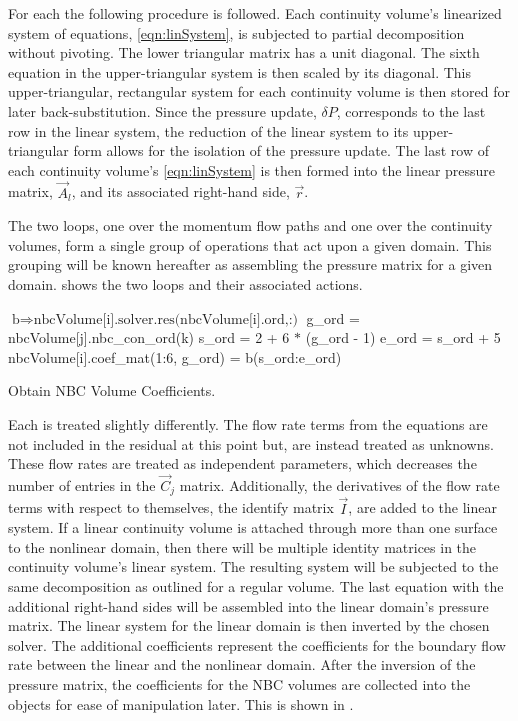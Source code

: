For each  the following procedure is followed.
Each continuity volume's linearized system of equations, \eqref{eqn:linSystem}, is subjected to partial  decomposition without pivoting.
The lower triangular matrix has a unit diagonal.
The sixth equation in the upper-triangular system is then scaled by its diagonal.
This upper-triangular, rectangular system for each continuity volume is then stored for later back-substitution.
Since the pressure update, $\delta P$, corresponds to the last row in the linear system, the reduction of the linear system to its upper-triangular form allows for the isolation of the pressure update.
The last row of each continuity volume's \eqref{eqn:linSystem} is then formed into the linear pressure matrix, $\vec{A}_{l}$, and its associated right-hand side, $\vec{r}$.

The two loops, one over the momentum flow paths and one over the continuity volumes, form a single group of operations that act upon a given domain.
This grouping will be known hereafter as assembling the pressure matrix for a given domain.
 shows the two loops and their associated actions.

\begin{algo}[ht!]
\setlength{\baselineskip}{0.625\baselineskip}
\begin{algorithmic}[1]
	\Set $\text{b} \Rightarrow \text{nbcVolume[i].solver.res(nbcVolume[i].ord,:)}$
			\Set g\_ord = nbcVolume[j].nbc\_con\_ord(k)
			\Set s\_ord = 2 + 6 $*$ (g\_ord - 1)
			\Set e\_ord = s\_ord + 5
			\Set nbcVolume[i].coef\_mat(1:6, g\_ord) = b(s\_ord:e\_ord)
		\EndFor
	\EndFor
\EndFor
\end{algorithmic}
\caption{Obtain NBC Volume Coefficients.}
\label{alg:domDecompGetCoef}
\end{algo}

Each  is treated slightly differently.
The flow rate terms from the equations are not included in the residual at this point but, are instead treated as unknowns.
These flow rates are treated as independent parameters, which decreases the number of entries in the $\vec{C}_{j}$ matrix.
Additionally, the derivatives of the flow rate terms with respect to themselves, the identify matrix $\vec{I}$, are added to the linear system.
If a linear continuity volume is attached through more than one surface to the nonlinear domain, then there will be multiple identity matrices in the continuity volume's linear system.
The resulting system will be subjected to the same  decomposition as outlined for a regular volume.
The last equation with the additional right-hand sides will be assembled into the linear domain's pressure matrix.
The linear system for the linear domain is then inverted by the chosen solver.
The additional coefficients represent the coefficients for the boundary flow rate between the linear and the nonlinear domain.
After the inversion of the pressure matrix, the coefficients for the NBC volumes are collected into the  objects for ease of manipulation later.
This is shown in .

